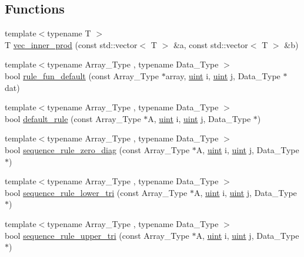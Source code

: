 \subsection*{Functions}
\begin{DoxyCompactItemize}
\item 
{\footnotesize template$<$typename T $>$ }\\T \hyperlink{namespacebarry_a0343fb4152724d5fa1ffa00d4b6182d9}{vec\+\_\+inner\+\_\+prod} (const std\+::vector$<$ T $>$ \&a, const std\+::vector$<$ T $>$ \&b)
\item 
{\footnotesize template$<$typename Array\+\_\+\+Type , typename Data\+\_\+\+Type $>$ }\\bool \hyperlink{namespacebarry_afb5a6f58fa7969d3027468e393eecd51}{rule\+\_\+fun\+\_\+default} (const Array\+\_\+\+Type $\ast$array, \hyperlink{namespacebarry_a11dfc53ddb4672278319aa04f1e09a6c}{uint} i, \hyperlink{namespacebarry_a11dfc53ddb4672278319aa04f1e09a6c}{uint} j, Data\+\_\+\+Type $\ast$dat)
\item 
{\footnotesize template$<$typename Array\+\_\+\+Type , typename Data\+\_\+\+Type $>$ }\\bool \hyperlink{namespacebarry_a1cb28b501bc7f88c0b3d68d51ad672e1}{default\+\_\+rule} (const Array\+\_\+\+Type $\ast$A, \hyperlink{namespacebarry_a11dfc53ddb4672278319aa04f1e09a6c}{uint} i, \hyperlink{namespacebarry_a11dfc53ddb4672278319aa04f1e09a6c}{uint} j, Data\+\_\+\+Type $\ast$)
\item 
{\footnotesize template$<$typename Array\+\_\+\+Type , typename Data\+\_\+\+Type $>$ }\\bool \hyperlink{namespacebarry_adec8d64df14ef90c3e94445e791eaa92}{sequence\+\_\+rule\+\_\+zero\+\_\+diag} (const Array\+\_\+\+Type $\ast$A, \hyperlink{namespacebarry_a11dfc53ddb4672278319aa04f1e09a6c}{uint} i, \hyperlink{namespacebarry_a11dfc53ddb4672278319aa04f1e09a6c}{uint} j, Data\+\_\+\+Type $\ast$)
\item 
{\footnotesize template$<$typename Array\+\_\+\+Type , typename Data\+\_\+\+Type $>$ }\\bool \hyperlink{namespacebarry_a2889c6210e2711e33c34ca9c8b5de7d9}{sequence\+\_\+rule\+\_\+lower\+\_\+tri} (const Array\+\_\+\+Type $\ast$A, \hyperlink{namespacebarry_a11dfc53ddb4672278319aa04f1e09a6c}{uint} i, \hyperlink{namespacebarry_a11dfc53ddb4672278319aa04f1e09a6c}{uint} j, Data\+\_\+\+Type $\ast$)
\item 
{\footnotesize template$<$typename Array\+\_\+\+Type , typename Data\+\_\+\+Type $>$ }\\bool \hyperlink{namespacebarry_a1433970b34e5904f846a0aa41abef448}{sequence\+\_\+rule\+\_\+upper\+\_\+tri} (const Array\+\_\+\+Type $\ast$A, \hyperlink{namespacebarry_a11dfc53ddb4672278319aa04f1e09a6c}{uint} i, \hyperlink{namespacebarry_a11dfc53ddb4672278319aa04f1e09a6c}{uint} j, Data\+\_\+\+Type $\ast$)

\end{DoxyCompactItemize}
